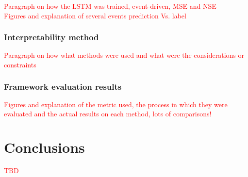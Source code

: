 \documentclass[12pt]{report}
\begin{document}
\textcolor{red}{Paragraph on how the LSTM was trained, event-driven, MSE and NSE}\\

\textcolor{red}{Figures and explanation of several events prediction Vs. label}\\
\subsection{Interpretability method}

\textcolor{red}{Paragraph on how what methods were used and what were the considerations or constraints}\\

\subsection{Framework evaluation results}
\textcolor{red}{Figures and explanation of the metric used, the process in which they were evaluated and the actual results on each method, lots of comparisons!}\\

\chapter{Conclusions} 
\textcolor{red}{TBD}\\

\newpage
	

\printbibliography
\end{document}
